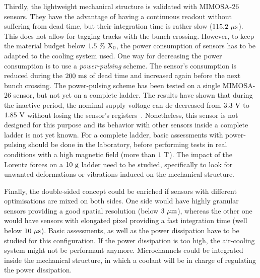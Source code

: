 Thirdly, the lightweight mechanical structure is validated with \gls{MIMOSA}-26 sensors.
They have the advantage of having a continuous readout without suffering from dead time, but their integration time is rather slow ($115.2~\rm{\mu s}$).
This does not allow for tagging tracks with the bunch crossing.
However, to keep the material budget below $1.5~\%~\rm{X_{0}}$, the power consumption of sensors has to be adapted to the cooling system used.
One way for decreasing the power consumption is to use a \textit{power-pulsing} scheme.
The sensor's consumption is reduced during the $200~\rm{ms}$ of dead time and increased again before the next bunch crossing.
The power-pulsing scheme has been tested on a single \gls{MIMOSA}-26 sensor, but not yet on a complete ladder.
The results have shown that during the inactive period, the nominal supply voltage can de decreased from $3.3~\rm{V}$ to $1.85~\rm{V}$ without losing the sensor's registers~\cite{Kuprash2013}.
Nonetheless, this sensor is not designed for this purpose and its behavior with other sensors inside a complete ladder is not yet known.
For a complete ladder, basic assessments with power-pulsing should be done in the laboratory, before performing tests in real conditions with a high magnetic field (more than $1~\rm{T}$).
The impact of the Lorentz forces on a $10~\rm{g}$ ladder need to be studied, specifically to look for unwanted deformations or vibrations induced on the mechanical structure.

Finally, the double-sided concept could be enriched if sensors with different optimisations are mixed on both sides.
One side would have highly granular sensors providing a good spatial resolution (below $3~\rm{\mu m}$), whereas the other one would have sensors with elongated pixel providing a fast integration time (well below $10~\rm{\mu s}$).
Basic assessments, as well as the power dissipation have to be studied for this configuration.
If the power dissipation is too high, the air-cooling system might not be performant anymore.
Microchannels could be integrated inside the mechanical structure, in which a coolant will be in charge of regulating the power dissipation.


